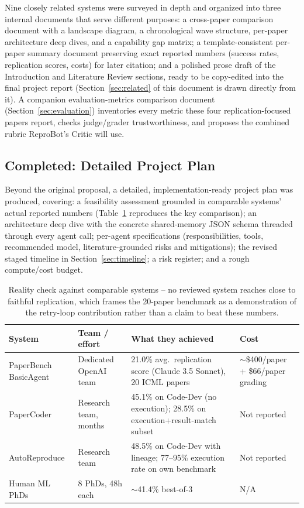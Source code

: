 \documentclass[11pt]{article}
\begin{document}
Nine closely related systems were surveyed in depth and organized into three internal
documents that serve different purposes: a cross-paper comparison document with a
landscape diagram, a chronological wave structure, per-paper architecture deep dives,
and a capability gap matrix; a template-consistent per-paper summary document preserving
exact reported numbers (success rates, replication scores, costs) for later citation;
and a polished prose draft of the Introduction and Literature Review sections, ready to
be copy-edited into the final project report (Section~\ref{sec:related} of this document
is drawn directly from it). A companion evaluation-metrics comparison document
(Section~\ref{sec:evaluation}) inventories every metric these four replication-focused
papers report, checks judge/grader trustworthiness, and proposes the combined rubric
ReproBot's Critic will use.

\subsection{Completed: Detailed Project Plan}

Beyond the original proposal, a detailed, implementation-ready project plan was
produced, covering: a feasibility assessment grounded in comparable systems' actual
reported numbers (Table~\ref{tab:reality-check} reproduces the key comparison); an
architecture deep dive with the concrete shared-memory JSON schema threaded through every
agent call; per-agent specifications (responsibilities, tools, recommended model,
literature-grounded risks and mitigations); the revised staged timeline in
Section~\ref{sec:timeline}; a risk register; and a rough compute/cost budget.

\begin{table}[h]
\centering
\small
\begin{tabular}{@{}p{3.2cm}p{4cm}p{4.8cm}p{2.8cm}@{}}
\toprule
\textbf{System} & \textbf{Team / effort} & \textbf{What they achieved} & \textbf{Cost} \\
\midrule
PaperBench BasicAgent & Dedicated OpenAI team & 21.0\% avg.\ replication score
(Claude 3.5 Sonnet), 20 ICML papers & $\sim$\$400/paper + \$66/paper grading \\
PaperCoder & Research team, months & 45.1\% on Code-Dev (no execution); 28.5\% on
execution+result-match subset & Not reported \\
AutoReproduce & Research team & 48.5\% on Code-Dev with lineage; 77--95\% execution rate
on own benchmark & Not reported \\
Human ML PhDs & 8 PhDs, 48h each & $\sim$41.4\% best-of-3 & N/A \\
\bottomrule
\end{tabular}
\caption{Reality check against comparable systems -- no reviewed system reaches close to
faithful replication, which frames the 20-paper benchmark as a demonstration of the
retry-loop contribution rather than a claim to beat these numbers.}
\label{tab:reality-check}
\end{table}
\end{document}
